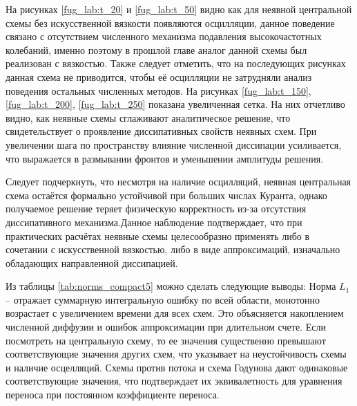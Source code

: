 \documentclass[a4paper,14pt]{extreport}
\begin{document}
На рисунках \ref{fug_lab:t_20} и \ref{fug_lab:t_50} видно как для неявной центральной схемы без искусственной вязкости появляются осцилляции, данное поведение связано с отсутствием численного механизма подавления высокочастотных колебаний, именно поэтому в прошлой главе аналог данной схемы был реализован с вязкостью. Также следует отметить, что на последующих рисунках данная схема не приводится, чтобы её осцилляции не затрудняли анализ поведения остальных численных методов. На рисунках \ref{fug_lab:t_150}, \ref{fug_lab:t_200}, \ref{fug_lab:t_250} показана увеличенная сетка. На них отчетливо видно, как неявные схемы сглаживают аналитическое решение, что свидетельствует о проявление диссипативных свойств неявных схем. При увеличении шага по пространству влияние численной диссипации усиливается, что выражается в размывании фронтов и уменьшении амплитуды решения.

Следует подчеркнуть, что несмотря на наличие осцилляций, неявная центральная схема остаётся формально устойчивой при больших числах Куранта, однако получаемое решение теряет физическую корректность из-за отсутствия диссипативного механизма.Данное наблюдение подтверждает, что при практических расчётах неявные схемы целесообразно применять либо в сочетании с искусственной вязкостью, либо в виде аппроксимаций, изначально обладающих направленной диссипацией.

Из таблицы \ref{tab:norms_compact5} можно сделать следующие выводы:
Норма $L_1$ -- отражает суммарную интегральную ошибку по всей области, монотонно возрастает с увеличением времени для всех схем. Это объясняется накоплением численной диффузии и ошибок аппроксимации при длительном счете. Если посмотреть на центральную схему, то ее значения существенно превышают соответствующие значения других схем, что указывает на неустойчивость схемы и наличие осцелляций. Схемы против потока и схема Годунова дают одинаковые соответствующие значения, что подтверждает их эквивалетность для уравнения переноса при постоянном коэффициенте переноса.
\end{document}
